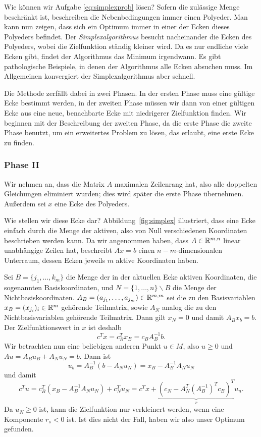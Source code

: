 Wie können wir Aufgabe \eqref{eq:simplexprob} lösen? Sofern die
zulässige Menge beschränkt ist, beschreiben die Nebenbedingungen immer
einen Polyeder. Man kann nun zeigen, dass sich ein Optimum immer in
einer der Ecken dieses Polyeders befindet. Der
\emph{Simplexalgorithmus} besucht nacheinander die Ecken des
Polyeders, wobei die Zielfunktion ständig kleiner wird. Da es nur
endliche viele Ecken gibt, findet der Algorithmus das Minimum
irgendwann. Es gibt pathologische Beispiele, in denen der Algorithmus
alle Ecken absuchen muss. Im Allgemeinen konvergiert der
Simplexalgorithmus aber schnell.

Die Methode zerfällt dabei in zwei Phasen. In der ersten Phase muss
eine gültige Ecke bestimmt werden, in der zweiten Phase müssen wir
dann von einer gültigen Ecke aus eine neue, benachbarte Ecke mit
niedrigerer Zielfunktion finden. Wir beginnen mit der Beschreibung der
zweiten Phase, da die erste Phase die zweite Phase benutzt, um ein
erweitertes Problem zu lösen, das erlaubt, eine erste Ecke zu finden.

\subsubsection*{Phase II}

Wir nehmen an, dass die Matrix $A$ maximalen Zeilenrang hat, also alle
doppelten Gleichungen eliminiert wurden; dies wird später die erste
Phase übernehmen.  Außerdem sei $x$ eine Ecke des Polyeders.

Wie stellen wir diese Ecke dar? Abbildung~\ref{fig:simplex}
illustriert, dass eine Ecke einfach durch die Menge der aktiven, also
von Null verschiedenen Koordinaten beschrieben werden kann. Da wir
angenommen haben, dass $A\in\mathbb{R}^{m,n}$ linear unabhängige Zeilen hat,
beschreibt $Ax=b$ einen $n-m$-dimensionalen Unterraum, dessen Ecken
jeweils $m$ aktive Koordinaten haben.

Sei $B=\{j_1,\ldots,k_m\}$ die Menge der in der aktuellen Ecke aktiven
Koordinaten, die sogenannten Basiskoordinaten, und
$N=\{1,\ldots,n\}\backslash B$ die Menge der
Nichtbasiskoordinaten. $A_B = (a_{j_1},\ldots,a_{j_m})\in\mathbb{R}^{m,m}$
sei die zu den Basisvariablen $x_B = (x_{j_i})_i\in\mathbb{R}^m$ gehörende
Teilmatrix, sowie $A_N$ analog die zu den Nichtbasisvariablen
gehörende Teilmatrix. Dann gilt $x_N=0$ und damit $A_Bx_b = b$.
Der Zielfunktionswert in $x$ ist deshalb
\begin{equation}
  c^Tx = c_B^Tx_B = c_BA_B^{-1}b.
\end{equation}
Wir betrachten nun eine beliebigen anderen Punkt $u\in M$, also $u\ge
0$ und $Au=A_Bu_B + A_Nu_N = b$. Dann ist
\begin{equation}
  \label{eq:simplexub}
  u_b = A_B^{-1}(b - A_Nu_N) = x_B - A_B^{-1}A_Nu_N
\end{equation}
und damit
\begin{equation}
  c^Tu = c_B^T(x_B - A_B^{-1}A_Nu_N) + c_N^Tu_N = c^Tx +
  \underbrace{\left(c_N - A_N^T\left(A_B^{-1}\right)^Tc_B\right)^T}_{r}u_n.
\end{equation}
Da $u_N\ge 0$ ist, kann die Zielfunktion nur verkleinert werden, wenn
eine Komponente $r_s < 0$ ist. Ist dies nicht der Fall, haben wir also
unser Optimum gefunden.

